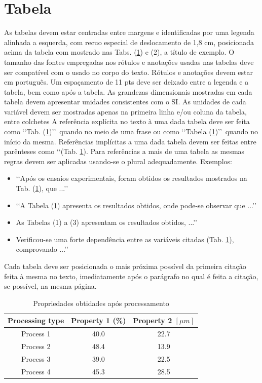 \section{Tabela}
As tabelas devem estar centradas entre margens e identificadas por uma legenda
alinhada a esquerda, com recuo especial de deslocamento de 1,8 cm, posicionada
acima da tabela com mostrado nas Tabs. (\ref{tab01}) e (2), a título de
exemplo. O tamanho das fontes empregadas nos rótulos e anotações usadas nas
tabelas deve ser compatível com o usado no corpo do texto. Rótulos e anotações
devem estar em português. Um espaçamento de 11 pts deve ser deixado entre a
legenda e a tabela, bem como após a tabela.
As grandezas dimensionais mostradas em cada tabela devem apresentar unidades
consistentes com o SI. As unidades de cada variável devem ser mostradas apenas
na primeira linha e/ou coluna da tabela, entre colchetes
A referência explícita no texto à uma dada tabela deve ser feita como
\lq\lq Tab. (\ref{tab01})\rq\rq\ quando no meio de uma frase ou como
\lq\lq Tabela (\ref{tab01})\rq\rq\ quando no início da mesma. Referências
implícitas a uma dada tabela devem ser feitas entre parênteses como
\lq\lq (Tab. \ref{tab01}). Para referências a mais de uma tabela as mesmas
regras devem ser aplicadas usando-se o plural adequadamente. Exemplos:
\begin{itemize}
\item \lq\lq Após os ensaios experimentais, foram obtidos os resultados
mostrados na Tab. (\ref{tab01}), que ...\rq\rq
\item \lq\lq A Tabela (\ref{tab01}) apresenta os resultados obtidos, onde
pode-se observar que ...\rq\rq
\item As Tabelas (1) a (3) apresentam os resultados obtidos, ...\rq\rq
\item Verificou-se uma forte dependência entre as variáveis citadas
(Tab. \ref{tab01}), comprovando ...\rq\rq
\end{itemize}
Cada tabela deve ser posicionada o mais próxima possível da primeira citação
feita à mesma no texto, imediatamente após o parágrafo no qual é feita a
citação, se possível, na mesma página.
\begin{table}[h]
\centering
\label{tab01}
\begin{tabular}{ccc}
\toprule
\textbf{Processing type} & \textbf{Property 1} (\%) &
\textbf{Property 2} $[\mu m]$ \\
\midrule
Process 1 & 40.0 & 22.7 \\
Process 2 & 48.4 & 13.9 \\
Process 3 & 39.0 & 22.5 \\
Process 4 & 45.3 & 28.5 \\
\bottomrule
\end{tabular}
\caption{Propriedades obtidades após processamento}
\end{table}
